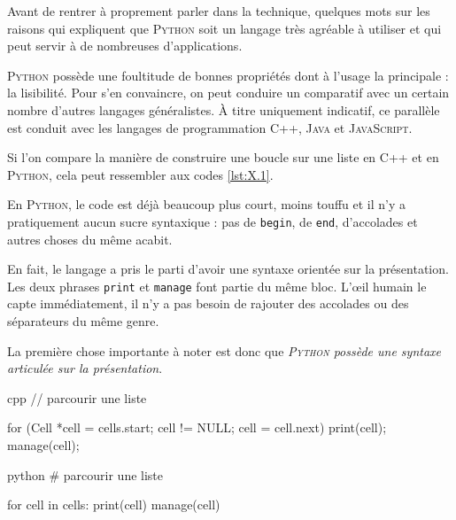 Avant de rentrer à proprement parler dans la technique, quelques mots sur les raisons qui expliquent que \textsc{Python} soit un langage très agréable à utiliser et qui peut servir à de nombreuses d'applications. 

\textsc{Python} possède une foultitude de bonnes propriétés dont à l'usage la principale : la lisibilité. Pour s'en convaincre, on peut conduire un comparatif avec un certain nombre d'autres langages généralistes. À titre uniquement indicatif, ce parallèle est conduit avec les langages de programmation \textsc{C++}, \textsc{Java} et \textsc{JavaScript}.



Si l'on compare la manière de construire une boucle sur une liste en \textsc{C++} et en \textsc{Python}, cela peut ressembler aux codes \ref{lst:X.1}. 

En \textsc{Python}, le code est déjà beaucoup plus court, moins touffu et il n'y a pratiquement aucun sucre syntaxique : pas de \texttt{begin}, de \texttt{end}, d'accolades et autres choses du même acabit.

En fait, le langage a pris le parti d'avoir une syntaxe orientée sur la présentation. Les deux phrases \texttt{print} et \texttt{manage} font partie du même bloc. L'œil humain le capte immédiatement, il n'y a pas besoin de rajouter des accolades ou des séparateurs du même genre.

La première chose importante à noter est donc que \textit{\textsc{Python} possède une syntaxe articulée sur la présentation}.

\begin{jazzcode*}
\caption{\label{lst:X.1}Comparaison d'une boucle réalisée en \textsc{C++} et en \textsc{Python}.}
\begin{codebox}[width=0.665\linewidth, nobeforeafter]{cpp}
// parcourir une liste

for (Cell *cell = cells.start; cell != NULL; cell = cell.next) {
	print(cell);
	manage(cell);
}
\end{codebox}
\qquad\quad %
\begin{codebox}[width=0.265\linewidth, nobeforeafter]{python}
# parcourir une liste

for cell in cells:
	print(cell)
	manage(cell)
\end{codebox}
\end{jazzcode*}

